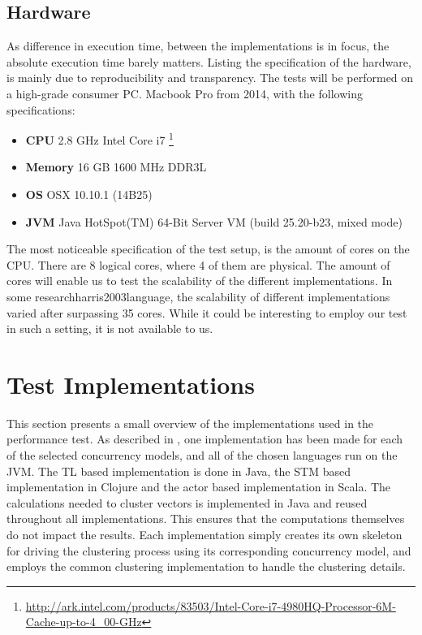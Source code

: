 \subsection{Hardware}
As difference in execution time, between the implementations is in focus, the absolute execution time barely matters. Listing the specification of the hardware, is mainly due to reproducibility and transparency.
The tests will be performed on a high-grade consumer PC. Macbook Pro from 2014, with the following specifications:
\begin{itemize}
	\item \textbf{CPU} 2.8 GHz Intel Core i7 \footnote{\url{http://ark.intel.com/products/83503/Intel-Core-i7-4980HQ-Processor-6M-Cache-up-to-4_00-GHz}}
	\item \textbf{Memory} 16 GB 1600 MHz DDR3L
	\item \textbf{\ac{OS}} OSX 10.10.1 (14B25)
	\item \textbf{\ac{JVM}} Java HotSpot(TM) 64-Bit Server VM (build 25.20-b23, mixed mode)
\end{itemize}

The most noticeable specification of the test setup, is the amount of cores on the \ac{CPU}. There are 8 logical cores, where 4 of them are physical. The amount of cores will enable us to test the scalability of the different implementations. In some research\ac{harris2003language}, the scalability of different implementations varied after surpassing 35 cores. While it could be interesting to employ our test in such a setting, it is not available to us.

\section{Test Implementations}
This section presents a small overview of the implementations used in the performance test. As described in , one implementation has been made for each of the selected concurrency models, and all of the chosen languages run on the \ac{JVM}. The \ac{TL} based implementation is done in Java, the \ac{STM} based implementation in Clojure and the actor based implementation in Scala. The calculations needed to cluster vectors is implemented in Java and reused throughout all implementations. This ensures that the computations themselves do not impact the results. Each implementation simply creates its own skeleton for driving the clustering process using its corresponding concurrency model, and employs the common clustering implementation to handle the clustering details. 

